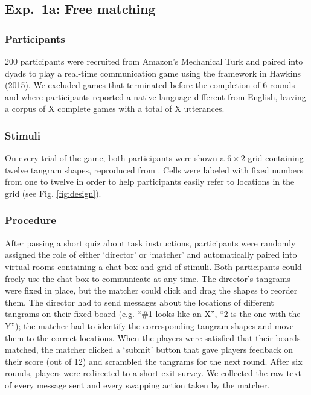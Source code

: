 \documentclass[alpha-refs]{wiley-article}
\begin{document}
\subsection{Exp.~1a: Free matching}

\subsubsection{Participants}\label{participants}

200 participants were recruited from Amazon's Mechanical Turk and paired
into dyads to play a real-time communication game using the framework in
Hawkins (2015). We excluded games that terminated before the completion
of 6 rounds and where participants reported a native language different
from English, leaving a corpus of X complete games with a total of
X utterances.

\subsubsection{Stimuli}\label{stimuli}

On every trial of the game, both participants were shown a \(6 \times 2\) grid containing twelve tangram shapes, reproduced from \cite{ClarkWilkesGibbs86_ReferringCollaborative}. 
Cells were labeled with fixed numbers from one to twelve in order to help participants easily refer to locations in the grid (see Fig. \ref{fig:design}).

\subsubsection{Procedure}\label{procedure}

After passing a short quiz about task instructions, participants were
randomly assigned the role of either `director' or `matcher' and
automatically paired into virtual rooms containing a chat box and grid
of stimuli. Both participants could freely use the chat box to
communicate at any time. The director's tangrams were fixed in place,
but the matcher could click and drag the shapes to reorder them. The
director had to send messages about the locations of different tangrams
on their fixed board (e.g. ``\#1 looks like an X'', ``2 is the one with
the Y''); the matcher had to identify the corresponding tangram shapes
and move them to the correct locations. When the players were satisfied
that their boards matched, the matcher clicked a `submit' button that
gave players feedback on their score (out of 12) and scrambled the
tangrams for the next round. After six rounds, players were redirected
to a short exit survey. We collected the raw text of every message sent
and every swapping action taken by the matcher.
\end{document}
